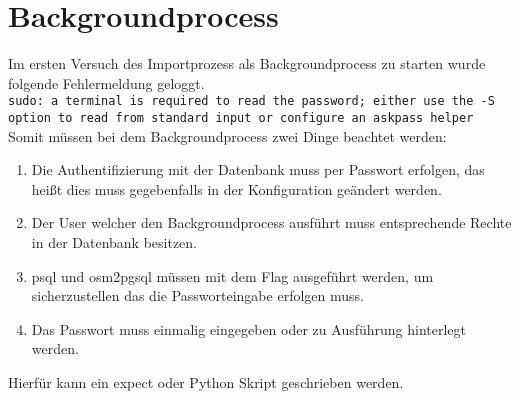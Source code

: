 \section{Backgroundprocess}
Im ersten Versuch des Importprozess als Backgroundprocess zu starten wurde folgende Fehlermeldung geloggt.\\
\lstinline[language={}]|sudo: a terminal is required to read the password; either use the -S option to read from standard input or configure an askpass helper|\\
Somit müssen bei dem Backgroundprocess zwei Dinge beachtet werden:
\begin{enumerate}
	\item Die Authentifizierung mit der Datenbank muss per Passwort erfolgen, das heißt dies muss gegebenfalls in der Konfiguration geändert werden.
	\item Der User welcher den Backgroundprocess ausführt muss entsprechende Rechte in der Datenbank besitzen.
	\item psql\cite{postgres-psql} und osm2pgsql\cite{osm2pgsql} müssen mit dem Flag  ausgeführt werden, um sicherzustellen das die Passworteingabe erfolgen muss.
	\item Das Passwort muss einmalig eingegeben oder zu Ausführung hinterlegt werden.
\end{enumerate}
Hierfür kann ein expect oder Python Skript geschrieben werden.